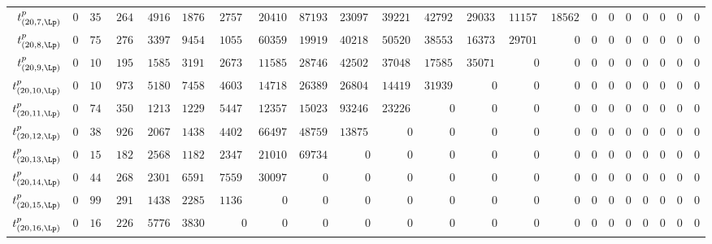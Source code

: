 \begin{tabular}{r|rrrrrrrrrrrrrrrrrrrrr}
  $t^{p}_{(20,7,\Lp)}$ & $0$ & $358822$ & $2641743164$ & $491667732333$ & $18765999153260$ & $275729338481620$ & $2041062453596088$ & $8719383654763257$ & $23097934651261848$ & $39221191065076272$ & $42792178506512400$ & $29033891168824080$ & $11157033214514880$ & $1856290571815680$ & $0$ & $0$ & $0$ & $0$ & $0$ & $0$ & $0$ \\
  $t^{p}_{(20,8,\Lp)}$ & $0$ & $752182$ & $2765150812$ & $339788496162$ & $9454721366456$ & $105580131553945$ & $603595614139506$ & $1991920040130447$ & $4021801036383768$ & $5052000267982152$ & $3855303056236320$ & $1637331703563600$ & $297014739753600$ & $0$ & $0$ & $0$ & $0$ & $0$ & $0$ & $0$ & $0$ \\
  $t^{p}_{(20,9,\Lp)}$ & $0$ & $1059945$ & $1957442954$ & $158576267208$ & $3191911512872$ & $26739466505195$ & $115851185209866$ & $287466761749993$ & $425026494581608$ & $370487431929762$ & $175852592054100$ & $35071904064780$ & $0$ & $0$ & $0$ & $0$ & $0$ & $0$ & $0$ & $0$ & $0$ \\
  $t^{p}_{(20,10,\Lp)}$ & $0$ & $1044990$ & $973773208$ & $51802481709$ & $745819122164$ & $4603215562010$ & $14718045015516$ & $26389107845485$ & $26804940936888$ & $14419572535287$ & $3193921399510$ & $0$ & $0$ & $0$ & $0$ & $0$ & $0$ & $0$ & $0$ & $0$ & $0$ \\
  $t^{p}_{(20,11,\Lp)}$ & $0$ & $743088$ & $350045224$ & $12136509600$ & $122941528340$ & $544791371345$ & $1235795120760$ & $1502359542733$ & $932468690048$ & $232267788333$ & $0$ & $0$ & $0$ & $0$ & $0$ & $0$ & $0$ & $0$ & $0$ & $0$ & $0$ \\
  $t^{p}_{(20,12,\Lp)}$ & $0$ & $389453$ & $92666122$ & $2067641811$ & $14382640100$ & $44020328955$ & $66497048466$ & $48759475170$ & $13875791952$ & $0$ & $0$ & $0$ & $0$ & $0$ & $0$ & $0$ & $0$ & $0$ & $0$ & $0$ & $0$ \\
  $t^{p}_{(20,13,\Lp)}$ & $0$ & $152596$ & $18259192$ & $256885953$ & $1182161612$ & $2347220310$ & $2101058580$ & $697347840$ & $0$ & $0$ & $0$ & $0$ & $0$ & $0$ & $0$ & $0$ & $0$ & $0$ & $0$ & $0$ & $0$ \\
  $t^{p}_{(20,14,\Lp)}$ & $0$ & $44988$ & $2682580$ & $23017686$ & $65913296$ & $75591805$ & $30097782$ & $0$ & $0$ & $0$ & $0$ & $0$ & $0$ & $0$ & $0$ & $0$ & $0$ & $0$ & $0$ & $0$ & $0$ \\
  $t^{p}_{(20,15,\Lp)}$ & $0$ & $9981$ & $291030$ & $1438290$ & $2285108$ & $1136905$ & $0$ & $0$ & $0$ & $0$ & $0$ & $0$ & $0$ & $0$ & $0$ & $0$ & $0$ & $0$ & $0$ & $0$ & $0$ \\
  $t^{p}_{(20,16,\Lp)}$ & $0$ & $1650$ & $22660$ & $57765$ & $38300$ & $0$ & $0$ & $0$ & $0$ & $0$ & $0$ & $0$ & $0$ & $0$ & $0$ & $0$ & $0$ & $0$ & $0$ & $0$ & $0$ \\

\end{tabular}
